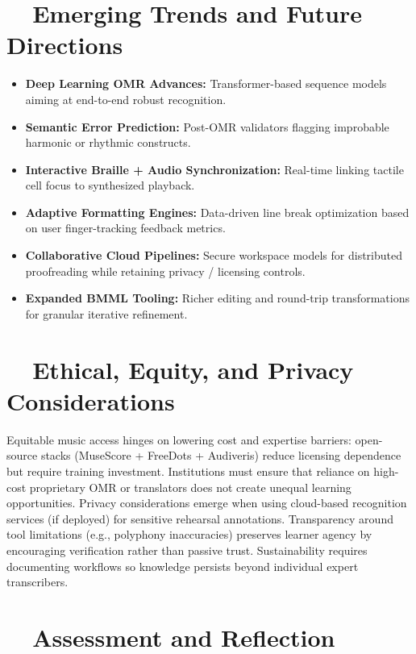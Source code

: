 \section{~~Emerging Trends and Future Directions}\label{ch10:sec:emerging-trends}
\begin{itemize}
	\item \textbf{Deep Learning OMR Advances:} Transformer-based sequence models aiming at end-to-end robust recognition.\supercite{sachindae-polyphonic-omr, GaetanBaert-OMRdeep}
	\item \textbf{Semantic Error Prediction:} Post-OMR validators flagging improbable harmonic or rhythmic constructs.
	\item \textbf{Interactive Braille + Audio Synchronization:} Real-time  linking tactile cell focus to synthesized playback.
	\item \textbf{Adaptive Formatting Engines:} Data-driven line break optimization based on user finger-tracking feedback metrics.
	\item \textbf{Collaborative Cloud Pipelines:} Secure workspace models for distributed proofreading while retaining privacy / licensing controls.
	\item \textbf{Expanded BMML Tooling:} Richer editing and round-trip transformations for granular iterative refinement.\supercite{braillemuse}
\end{itemize}

\section{~~Ethical, Equity, and Privacy Considerations}\label{ch10:sec:ethics-equity-privacy}
Equitable music access hinges on lowering cost and expertise barriers: open-source stacks (MuseScore + FreeDots + Audiveris) reduce licensing dependence but require training investment.\supercite{musescore-accessibility, blindguru-freedots} Institutions must ensure that reliance on high-cost proprietary OMR or translators does not create unequal learning opportunities. Privacy considerations emerge when using cloud-based recognition services (if deployed) for sensitive rehearsal annotations. Transparency around tool limitations (e.g., polyphony inaccuracies) preserves learner agency by encouraging verification rather than passive trust. Sustainability requires documenting workflows so knowledge persists beyond individual expert transcribers.

\section{~~Assessment and Reflection}\label{ch10:sec:assessment-reflection}
